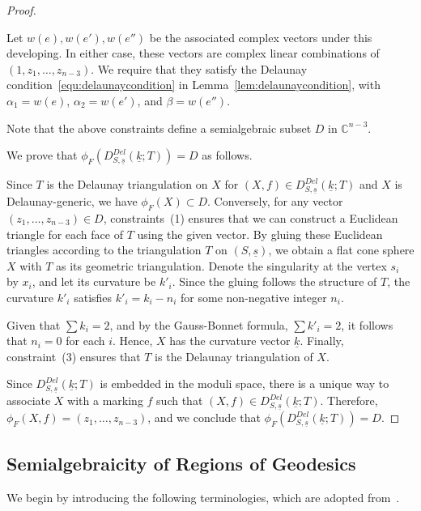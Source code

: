 \documentclass{compositio}
\numberwithin{equation}{section}
\numberwithin{figure}{section}
\theoremstyle{definition}
\theoremstyle{plain}
\begin{document}
{\begin{proof}
\begin{enumerate}
        Let $w(e), w(e'), w(e'')$ be the associated complex vectors under this developing. In either case, these vectors are complex linear combinations of  $(1, z_1, \ldots, z_{n-3})$. We require that they satisfy the Delaunay condition~\eqref{equ:delaunaycondition} in Lemma~\ref{lem:delaunaycondition}, with $\alpha_1 = w(e)$, $\alpha_2 = w(e')$, and $\beta = w(e'')$.
    \end{enumerate}
    Note that the above constraints define a semialgebraic subset $D$ in $\mathbb{C}^{n-3}$.

    We prove that $\phi_F(D_{S,\underline{s}}^{Del}(\underline{k};T)) = D$ as follows.
    
    Since $T$ is the Delaunay triangulation on $X$ for $(X, f) \in D_{S,\underline{s}}^{Del}(\underline{k};T)$ and $X$ is Delaunay-generic, we have $\phi_F(X) \subset D$. Conversely, for any vector $(z_1, \ldots, z_{n-3}) \in D$, constraints~(1) ensures that we can construct a Euclidean triangle for each face of $T$ using the given vector. By gluing these Euclidean triangles according to the triangulation $T$ on $(S, \underline{s})$, we obtain a flat cone sphere $X$ with $T$ as its geometric triangulation. Denote the singularity at the vertex $s_i$ by $x_i$, and let its curvature be $k'_i$. Since the gluing follows the structure of $T$, the curvature $k'_i$ satisfies $k'_i = k_i - n_i$ for some non-negative integer $n_i$. 
    
    Given that $\sum k_i = 2$, and by the Gauss-Bonnet formula, $\sum k'_i = 2$, it follows that $n_i = 0$ for each $i$. Hence, $X$ has the curvature vector $\underline{k}$. Finally, constraint~(3) ensures that $T$ is the Delaunay triangulation of $X$. 
    
    Since $D_{S,\underline{s}}^{Del}(\underline{k};T)$ is embedded in the moduli space, there is a unique way to associate $X$ with a marking $f$ such that $(X, f) \in D_{S,\underline{s}}^{Del}(\underline{k};T)$. Therefore, $\phi_F(X, f) = (z_1, \ldots, z_{n-3})$, and we conclude that $\phi_F(D_{S,\underline{s}}^{Del}(\underline{k};T)) = D$.
\end{proof}

\subsection{Semialgebraicity of Regions of Geodesics}
We begin by introducing the following terminologies, which are adopted from~\cite{Tabachnikov1995, RSch06, RSch08, Tabachnikov2005,RSch22}.

}
\end{document}
